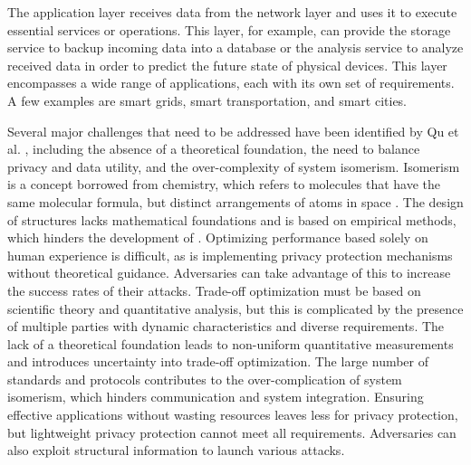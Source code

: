 The application layer receives data from the network layer and uses it to
execute essential services or operations. This layer, for example, can provide
the storage service to backup incoming data into a database or the analysis
service to analyze received data in order to predict the future state of
physical devices. This layer encompasses a wide range of applications, each
with its own set of requirements. A few examples are smart grids, smart
transportation, and smart cities.

Several major challenges that need to be addressed have been identified by
Qu et al. \cite{Qu2018Privacy}, including the absence of a theoretical foundation,
the need to balance privacy and data utility, and the over-complexity of system
isomerism. Isomerism is a concept borrowed from chemistry, which refers to
molecules that have the same molecular formula, but distinct arrangements of
atoms in space \cite{petrucci2023general}. The design of \hyperlink{\acronym}{\acronym} structures lacks
mathematical foundations and is based on empirical methods, which hinders
the development of \hyperlink{\acronym}{\acronym}. Optimizing \hyperlink{\acronym}{\acronym} performance based solely on human experience
is difficult, as is implementing privacy protection mechanisms without theoretical
guidance. Adversaries can take advantage of this to increase the success rates
of their attacks. Trade-off optimization must be based on scientific theory
and quantitative analysis, but this is complicated by the presence of multiple
parties with dynamic characteristics and diverse requirements. The lack of a
theoretical foundation leads to non-uniform quantitative measurements and introduces
uncertainty into trade-off optimization. The large number of standards and protocols
contributes to the over-complication of system isomerism, which hinders communication
and system integration. Ensuring effective \hyperlink{\acronym}{\acronym} applications without wasting resources
leaves less for privacy protection, but lightweight privacy protection cannot
meet all requirements. Adversaries can also exploit structural information to
launch various attacks.

